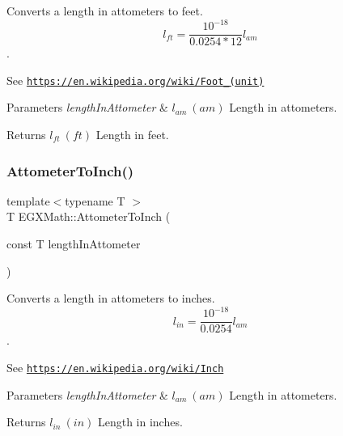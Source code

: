 Converts a length in attometers to feet. \[ l_{ft}= \frac{10^{-18}}{0.0254 * 12} l_{am} \]. 

See \href{https://en.wikipedia.org/wiki/Foot_(unit)}{\tt https\+://en.\+wikipedia.\+org/wiki/\+Foot\+\_\+(unit)} 
\begin{DoxyParams}{Parameters}
{\em length\+In\+Attometer} & $ l_{am}\ (am)$ Length in attometers. \\
\hline
\end{DoxyParams}
\begin{DoxyReturn}{Returns}
$ l_{ft}\ (ft)$ Length in feet. 
\end{DoxyReturn}
\mbox{\label{group___e_g_x_math-_conversions-_length_conversions-_s_i-_attometer-_imperial_ga76cb652df52a89284cc3661a670d4990}} 
\subsubsection{\texorpdfstring{Attometer\+To\+Inch()}{AttometerToInch()}}
{\footnotesize\ttfamily template$<$typename T $>$ \\
T E\+G\+X\+Math\+::\+Attometer\+To\+Inch (\begin{DoxyParamCaption}\item[{const T}]{length\+In\+Attometer }\end{DoxyParamCaption})}



Converts a length in attometers to inches. \[ l_{in}= \frac{10^{-18}}{0.0254} l_{am} \]. 

See \href{https://en.wikipedia.org/wiki/Inch}{\tt https\+://en.\+wikipedia.\+org/wiki/\+Inch} 
\begin{DoxyParams}{Parameters}
{\em length\+In\+Attometer} & $ l_{am}\ (am)$ Length in attometers. \\
\hline
\end{DoxyParams}
\begin{DoxyReturn}{Returns}
$ l_{in}\ (in)$ Length in inches. 
\end{DoxyReturn}
\mbox{\label{group___e_g_x_math-_conversions-_length_conversions-_s_i-_attometer-_imperial_ga1ad78989a93e5316f787a6412e2c8e3a}} 
